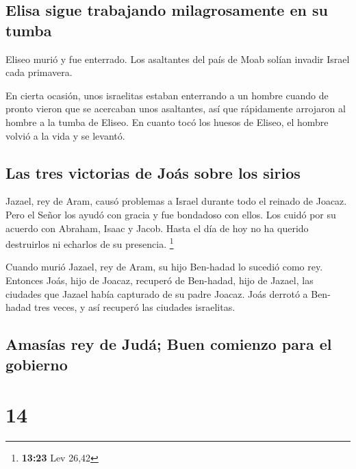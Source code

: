 \hypertarget{elisa-sigue-trabajando-milagrosamente-en-su-tumba}{%
\subsection{Elisa sigue trabajando milagrosamente en su
tumba}\label{elisa-sigue-trabajando-milagrosamente-en-su-tumba}}

 Eliseo murió y fue enterrado. Los asaltantes del país de
Moab solían invadir Israel cada primavera.

 En cierta ocasión, unos israelitas estaban enterrando a
un hombre cuando de pronto vieron que se acercaban unos asaltantes, así
que rápidamente arrojaron al hombre a la tumba de Eliseo. En cuanto tocó
los huesos de Eliseo, el hombre volvió a la vida y se levantó.

\hypertarget{las-tres-victorias-de-jouxe1s-sobre-los-sirios}{%
\subsection{Las tres victorias de Joás sobre los
sirios}\label{las-tres-victorias-de-jouxe1s-sobre-los-sirios}}

 Jazael, rey de Aram, causó problemas a Israel durante
todo el reinado de Joacaz.  Pero el Señor los ayudó con
gracia y fue bondadoso con ellos. Los cuidó por su acuerdo con Abraham,
Isaac y Jacob. Hasta el día de hoy no ha querido destruirlos ni echarlos
de su presencia. \footnote{\textbf{13:23} Lev 26,42}

 Cuando murió Jazael, rey de Aram, su hijo Ben-hadad lo
sucedió como rey.  Entonces Joás, hijo de Joacaz,
recuperó de Ben-hadad, hijo de Jazael, las ciudades que Jazael había
capturado de su padre Joacaz. Joás derrotó a Ben-hadad tres veces, y así
recuperó las ciudades israelitas.

\hypertarget{amasuxedas-rey-de-juduxe1-buen-comienzo-para-el-gobierno}{%
\subsection{Amasías rey de Judá; Buen comienzo para el
gobierno}\label{amasuxedas-rey-de-juduxe1-buen-comienzo-para-el-gobierno}}

\hypertarget{section-13}{%
\section{14}\label{section-13}}

